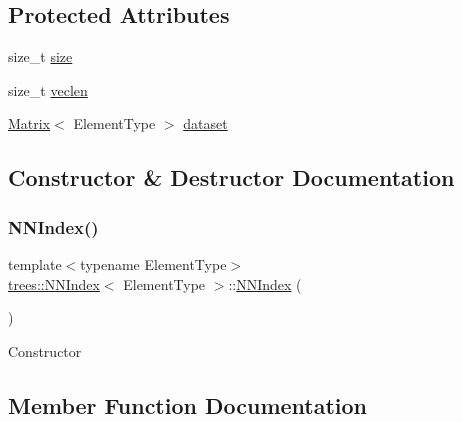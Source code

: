 \subsection*{Protected Attributes}
\begin{DoxyCompactItemize}
\item 
size\+\_\+t \hyperlink{classtrees_1_1_n_n_index_a2c14aa447b5461fb839213f092881b23}{size}
\item 
size\+\_\+t \hyperlink{classtrees_1_1_n_n_index_a3da4f85f9618451a8f7d27301fb6ac8c}{veclen}
\item 
\hyperlink{classtrees_1_1_matrix}{Matrix}$<$ Element\+Type $>$ \hyperlink{classtrees_1_1_n_n_index_a895867d67826166ea69def3488847cc6}{dataset}
\end{DoxyCompactItemize}


\subsection{Constructor \& Destructor Documentation}
\mbox{\label{classtrees_1_1_n_n_index_ae314d8a7c8c0db0eaf22b667b4b4a14e}} 
\subsubsection{\texorpdfstring{N\+N\+Index()}{NNIndex()}}
{\footnotesize\ttfamily template$<$typename Element\+Type$>$ \\
\hyperlink{classtrees_1_1_n_n_index}{trees\+::\+N\+N\+Index}$<$ Element\+Type $>$\+::\hyperlink{classtrees_1_1_n_n_index}{N\+N\+Index} (\begin{DoxyParamCaption}{ }\end{DoxyParamCaption})\hspace{0.3cm}{\ttfamily [inline]}}

Constructor 

\subsection{Member Function Documentation}
\mbox{\label{classtrees_1_1_n_n_index_ad8db1182322eba8c1f68ce250e45a36c}} 
